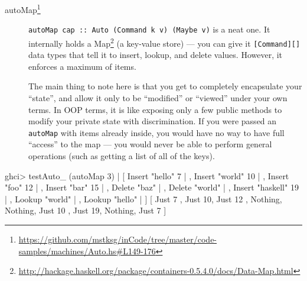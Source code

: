 \documentclass[]{article}
\newenvironment{Shaded}{}{}
\newcommand{\DataTypeTok}[1]{\textcolor[rgb]{0.56,0.13,0.00}{{#1}}}
\newcommand{\DecValTok}[1]{\textcolor[rgb]{0.25,0.63,0.44}{{#1}}}
\newcommand{\StringTok}[1]{\textcolor[rgb]{0.25,0.44,0.63}{{#1}}}
\newcommand{\FunctionTok}[1]{\textcolor[rgb]{0.02,0.16,0.49}{{#1}}}
\newcommand{\NormalTok}[1]{{#1}}
\renewcommand{\href}[2]{#2\footnote{\url{#1}}}
\begin{document}
\begin{description}
\item[\href{https://github.com/mstksg/inCode/tree/master/code-samples/machines/Auto.hs\#L149-176}{autoMap}]
\texttt{autoMap\ cap\ ::\ Auto\ (Command\ k\ v)\ (Maybe\ v)} is a neat one. It
internally holds a
\href{http://hackage.haskell.org/package/containers-0.5.4.0/docs/Data-Map.html}{Map}
(a key-value store) --- you can give it \texttt{{[}Command{]}{[}{]}} data types
that tell it to insert, lookup, and delete values. However, it enforces a
maximum of items.

The main thing to note here is that you get to completely encapsulate your
``state'', and allow it only to be ``modified'' or ``viewed'' under your own
terms. In OOP terms, it is like exposing only a few public methods to modify
your private state with discrimination. If you were passed an \texttt{autoMap}
with items already inside, you would have no way to have full ``access'' to the
map --- you would never be able to perform general operations (such as getting a
list of all of the keys).
\end{description}

\begin{Shaded}
\begin{Highlighting}[]
\NormalTok{ghci}\FunctionTok{>} \NormalTok{testAuto_ (autoMap }\DecValTok{3}\NormalTok{)}
    \FunctionTok{|}   \NormalTok{[ }\DataTypeTok{Insert} \StringTok{"hello"} \DecValTok{7}
    \FunctionTok{|}   \NormalTok{, }\DataTypeTok{Insert} \StringTok{"world"} \DecValTok{10}
    \FunctionTok{|}   \NormalTok{, }\DataTypeTok{Insert} \StringTok{"foo"} \DecValTok{12}
    \FunctionTok{|}   \NormalTok{, }\DataTypeTok{Insert} \StringTok{"bar"} \DecValTok{15}
    \FunctionTok{|}   \NormalTok{, }\DataTypeTok{Delete} \StringTok{"baz"}
    \FunctionTok{|}   \NormalTok{, }\DataTypeTok{Delete} \StringTok{"world"}
    \FunctionTok{|}   \NormalTok{, }\DataTypeTok{Insert} \StringTok{"haskell"} \DecValTok{19}
    \FunctionTok{|}   \NormalTok{, }\DataTypeTok{Lookup} \StringTok{"world"}
    \FunctionTok{|}   \NormalTok{, }\DataTypeTok{Lookup} \StringTok{"hello"}
    \FunctionTok{|}   \NormalTok{]}
\NormalTok{[ }\DataTypeTok{Just} \DecValTok{7} \NormalTok{, }\DataTypeTok{Just} \DecValTok{10}\NormalTok{, }\DataTypeTok{Just} \DecValTok{12}
\NormalTok{, }\DataTypeTok{Nothing}\NormalTok{, }\DataTypeTok{Nothing}\NormalTok{, }\DataTypeTok{Just} \DecValTok{10}
\NormalTok{, }\DataTypeTok{Just} \DecValTok{19}\NormalTok{, }\DataTypeTok{Nothing}\NormalTok{, }\DataTypeTok{Just} \DecValTok{7}  \NormalTok{]}
\end{Highlighting}
\end{Shaded}
\end{document}
